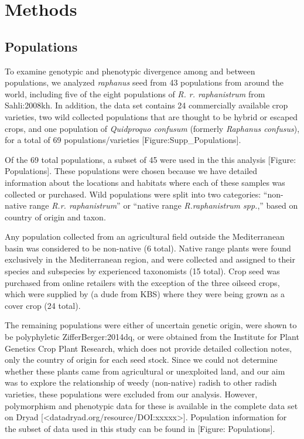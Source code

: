 \documentclass[twocolumn]{bmcart}%
\begin{document}
\section*{Methods}

\subsection*{Populations}

To examine genotypic and phenotypic divergence among and between populations, we analyzed \textit{raphanus} seed from 43 populations from around the world, including five of the eight populations of \textit{R. r. raphanistrum} from {Sahli:2008kh}. In addition, the data set contains 24 commercially available crop varieties, two wild collected populations that are thought to be hybrid or escaped crops, and one population of \textit{Quidproquo confusum} (formerly \textit{Raphanus confusus}), for a total of 69 populations/varieties [Figure:Supp\_Populations].

Of the 69 total populations, a subset of 45 were used in the this analysis [Figure: Populations]. These populations were chosen because we have detailed information about the locations and habitats where each of these samples was collected or purchased. Wild populations were split into two categories: “non-native range \textit{R.r. raphanistrum}” or “native range \textit{R.raphanistrum spp.},” based on country of origin and taxon.

Any population collected from an agricultural field outside the Mediterranean basin was considered to be non-native (6 total). Native range plants were found exclusively in the Mediterranean region, and were collected and assigned to their species and subspecies by experienced taxonomists (15 total). Crop seed was purchased from online retailers with the exception of the three oilseed crops, which were supplied by (a dude from KBS) where they were being grown as a cover crop (24 total).

The remaining populations were either of uncertain genetic origin, were shown to be polyphyletic {ZifferBerger:2014dq}, or were obtained from the Institute for Plant Genetics Crop Plant Research, which does not provide detailed collection notes, only the country of origin for each seed stock. Since we could not determine whether these plants came from agricultural or unexploited land, and our aim was to explore the relationship of weedy (non-native) radish to other radish varieties, these populations were excluded from our analysis. However, polymorphism and phenotypic data for these is available in the complete data set on Dryad [<datadryad.org/resource/DOI:xxxxx>]. Population information for the subset of data used in this study can be found in [Figure: Populations].
\end{document}
